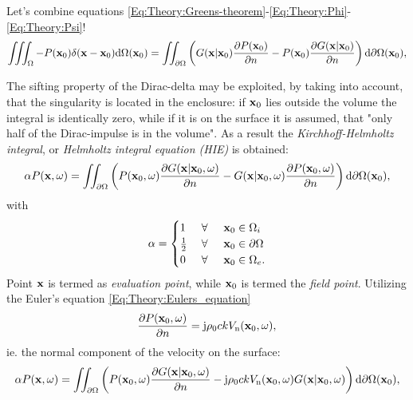 Let's combine equations \eqref{Eq:Theory:Greens-theorem}-\eqref{Eq:Theory:Phi}-\eqref{Eq:Theory:Psi}!
\begin{equation}
\iiint_{\Omega} - P(\mathbf{x}_0) \delta(\mathbf{x} - \mathbf{x}_0)
  \mathrm{d} \Omega(\mathbf{x}_0) = 
\iint_{\partial \Omega}  \left(  G(\mathbf{x}|\mathbf{x}_0) \frac{\partial P(\mathbf{x}_0)}{\partial n}  - P(\mathbf{x}_0)  \frac{\partial G(\mathbf{x}|\mathbf{x}_0)}{\partial n}  \right)   \mathrm{d} \partial \Omega ( \mathbf{x}_0),
\end{equation}

The sifting property of the Dirac-delta may be exploited, by taking into account, that the singularity is located in the enclosure: if $\mathbf{x}_0$ lies outside the volume the integral is identically zero, while if it is on the surface it is assumed, that "only half of the Dirac-impulse is in the volume". As a result the \emph{Kirchhoff-Helmholtz integral}, or \emph{Helmholtz integral equation (HIE)} is obtained:
\begin{equation}
\alpha P(\mathbf{x},\omega) = 
\iint_{\partial \Omega}  \left( 
P(\mathbf{x}_0,\omega)  \frac{\partial G(\mathbf{x}|\mathbf{x}_0,\omega)}{\partial n}  -  
G(\mathbf{x}|\mathbf{x}_0,\omega) \frac{\partial P(\mathbf{x}_0,\omega)}{\partial n} 
\right)   \mathrm{d} \partial \Omega ( \mathbf{x}_0),
\label{Eq:Theory:Kirchhoff-Helmholtz}
\end{equation}
with
\begin{equation*}
\alpha = \begin{cases} 
1           & \hspace{1mm} \forall \hspace{5mm}  \mathbf{x}_0 \in \Omega_i  	   \\
\frac{1}{2} & \hspace{1mm} \forall \hspace{5mm}  \mathbf{x}_0 \in \partial \Omega  \\
0 			& \hspace{1mm} \forall \hspace{5mm}  \mathbf{x}_0 \in \Omega_e.
\end{cases}
\end{equation*}
Point $\mathbf{x}$ is termed as \emph{evaluation point}, while $\mathbf{x}_0$ is termed the \emph{field point}. Utilizing the Euler's equation \eqref{Eq:Theory:Eulers_equation}
\begin{equation}
\frac{\partial P(\mathbf{x}_0,\omega)}{\partial n} = \mathrm{j} \rho_0 c k V_{\mathrm{n}}(\mathbf{x}_0,\omega),
\end{equation}
ie. the normal component of the velocity on the surface:
\begin{equation}
\alpha P(\mathbf{x},\omega) = 
\iint_{\partial \Omega}  \left(  
P(\mathbf{x}_0,\omega)  \frac{\partial G(\mathbf{x}|\mathbf{x}_0,\omega)}{\partial n}  -
\mathrm{j} \rho_0 c k V_{\mathrm{n}}(\mathbf{x}_0,\omega) G(\mathbf{x}|\mathbf{x}_0,\omega) 
\right)   \mathrm{d} \partial \Omega ( \mathbf{x}_0),
\label{Eq:Theory:Kirchhoff}
\end{equation}

